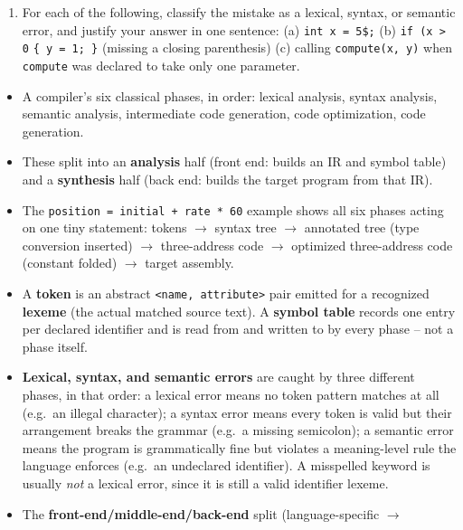 \documentclass[full-course-notes.tex]{subfiles}
\begin{document}
\begin{enrichment}
\begin{enumerate}
  \texttt{position} example's tree, and identify which single node the semantic analyzer would
  need to annotate if \texttt{step} were declared \texttt{real} instead of integer.
  \item For each of the following, classify the mistake as a lexical, syntax, or semantic error,
  and justify your answer in one sentence: (a) \texttt{int x = 5\$;} (b) \texttt{if (x > 0}
  \texttt{\{ y = 1; \}} (missing a closing parenthesis) (c) calling \texttt{compute(x, y)} when
  \texttt{compute} was declared to take only one parameter.
\end{enumerate}
\end{enrichment}

\begin{takeaways}
\begin{itemize}
  \item A compiler's six classical phases, in order: lexical analysis, syntax analysis, semantic
  analysis, intermediate code generation, code optimization, code generation.
  \item These split into an \textbf{analysis} half (front end: builds an IR and symbol table)
  and a \textbf{synthesis} half (back end: builds the target program from that IR).
  \item The \texttt{position = initial + rate * 60} example shows all six phases acting on one
  tiny statement: tokens $\to$ syntax tree $\to$ annotated tree (type conversion inserted)
  $\to$ three-address code $\to$ optimized three-address code (constant folded) $\to$ target
  assembly.
  \item A \textbf{token} is an abstract \texttt{<name, attribute>} pair emitted for a recognized
  \textbf{lexeme} (the actual matched source text). A \textbf{symbol table} records one entry
  per declared identifier and is read from and written to by every phase -- not a phase itself.
  \item \textbf{Lexical, syntax, and semantic errors} are caught by three different phases, in
  that order: a lexical error means no token pattern matches at all (e.g.\ an illegal
  character); a syntax error means every token is valid but their arrangement breaks the grammar
  (e.g.\ a missing semicolon); a semantic error means the program is grammatically fine but
  violates a meaning-level rule the language enforces (e.g.\ an undeclared identifier). A
  misspelled keyword is usually \emph{not} a lexical error, since it is still a valid identifier
  lexeme.
  \item The \textbf{front-end/middle-end/back-end} split (language-specific $\to$

\end{itemize}
\end{takeaways}
\end{document}
